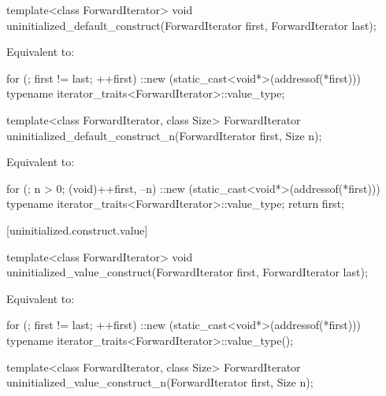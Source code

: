 %
\begin{itemdecl}
template<class ForwardIterator>
  void uninitialized_default_construct(ForwardIterator first, ForwardIterator last);
\end{itemdecl}

\begin{itemdescr}
\pnum
\effects
Equivalent to:
\begin{codeblock}
for (; first != last; ++first)
  ::new (static_cast<void*>(addressof(*first)))
    typename iterator_traits<ForwardIterator>::value_type;
\end{codeblock}
\end{itemdescr}

%
\begin{itemdecl}
template<class ForwardIterator, class Size>
  ForwardIterator uninitialized_default_construct_n(ForwardIterator first, Size n);
\end{itemdecl}

\begin{itemdescr}
\pnum
\effects
Equivalent to:
\begin{codeblock}
for (; n > 0; (void)++first, --n)
  ::new (static_cast<void*>(addressof(*first)))
    typename iterator_traits<ForwardIterator>::value_type;
return first;
\end{codeblock}
\end{itemdescr}

[uninitialized.construct.value]{}

%
\begin{itemdecl}
template<class ForwardIterator>
  void uninitialized_value_construct(ForwardIterator first, ForwardIterator last);
\end{itemdecl}

\begin{itemdescr}
\pnum
\effects
Equivalent to:
\begin{codeblock}
for (; first != last; ++first)
  ::new (static_cast<void*>(addressof(*first)))
    typename iterator_traits<ForwardIterator>::value_type();
\end{codeblock}
\end{itemdescr}

%
\begin{itemdecl}
template<class ForwardIterator, class Size>
  ForwardIterator uninitialized_value_construct_n(ForwardIterator first, Size n);
\end{itemdecl}

